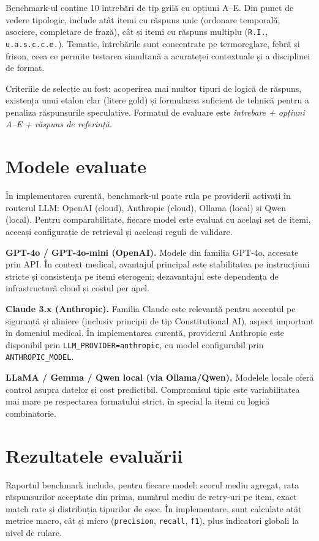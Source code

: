 \documentclass[12pt, a4paper, oneside, romanian]{teza-upb}
\begin{document}
Benchmark-ul conține 10 întrebări de tip grilă cu opțiuni A--E. Din punct de vedere tipologic, include atât itemi cu răspuns unic (ordonare temporală, asociere, completare de frază), cât și itemi cu răspuns multiplu (\texttt{R.I.}, \texttt{u.a.s.c.c.e.}). Tematic, întrebările sunt concentrate pe termoreglare, febră și frison, ceea ce permite testarea simultană a acurateței contextuale și a disciplinei de format.

Criteriile de selecție au fost: acoperirea mai multor tipuri de logică de răspuns, existența unui etalon clar (litere gold) și formularea suficient de tehnică pentru a penaliza răspunsurile speculative. Formatul de evaluare este \textit{întrebare + opțiuni A--E + răspuns de referință}.

\section{Modele evaluate}

În implementarea curentă, benchmark-ul poate rula pe providerii activați în routerul LLM: OpenAI (cloud), Anthropic (cloud), Ollama (local) și Qwen (local). Pentru comparabilitate, fiecare model este evaluat cu același set de itemi, aceeași configurație de retrieval și aceleași reguli de validare.

\textbf{GPT-4o / GPT-4o-mini (OpenAI).} Modele din familia GPT-4o, accesate prin API. În context medical, avantajul principal este stabilitatea pe instrucțiuni stricte și consistența pe itemi eterogeni; dezavantajul este dependența de infrastructură cloud și costul per apel.

\textbf{Claude 3.x (Anthropic).} Familia Claude este relevantă pentru accentul pe siguranță și aliniere (inclusiv principii de tip Constitutional AI), aspect important în domeniul medical. În implementarea curentă, providerul Anthropic este disponibil prin \texttt{LLM\_PROVIDER=anthropic}, cu model configurabil prin \texttt{ANTHROPIC\_MODEL}.

\textbf{LLaMA / Gemma / Qwen local (via Ollama/Qwen).} Modelele locale oferă control asupra datelor și cost predictibil. Compromisul tipic este variabilitatea mai mare pe respectarea formatului strict, în special la itemi cu logică combinatorie.

\section{Rezultatele evaluării}

Raportul benchmark include, pentru fiecare model: scorul mediu agregat, rata răspunsurilor acceptate din prima, numărul mediu de retry-uri pe item, exact match rate și distribuția tipurilor de eșec. În implementare, sunt calculate atât metrice macro, cât și micro (\texttt{precision}, \texttt{recall}, \texttt{f1}), plus indicatori globali la nivel de rulare.
\end{document}
